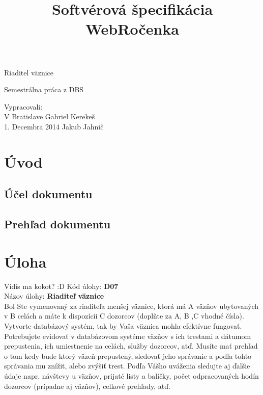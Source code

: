 \documentclass[slovak, 12pt, Times New Roman]{article}
\begin{document}
	\thispagestyle{fancy}
		\begin{center}\huge{Riaditel väznice\\\par}Semestrálna práca z DBS\end{center}
	\title{Softvérová špecifikácia WebRočenka}
	\date{}

	\begin{minipage}[b]{\textwidth}
	    \vspace{110mm}	 
	    \large   	\hspace{110mm} Vypracovali:\\
	    V Bratislave \hspace{82mm} Gabriel Kerekeš \\
	    1. Decembra 2014 \hspace{70mm} Jakub Jahnič \\
	    \vspace{-20mm} 
	\end{minipage}

	\clearpage
	\tableofcontents
	\clearpage

	\section{Úvod}
		\subsection{Účel dokumentu}

		\subsection{Prehľad dokumentu}
	\section{Úloha}
		Vidis ma kokot? :D
		Kód úlohy: \textbf{D07} \\
		Názov úlohy: \textbf{Riaditeľ väznice} \\

		Bol Ste vymenovaný za riaditeľa menšej väznice, ktorá má A väzňov ubytovaných v B celách a máte k dispozícii C dozorcov (doplňte za A, B
		,C vhodné čísla). Vytvorte databázový systém, tak by Vaša väznica mohla efektívne fungovať. Potrebujete evidovať v databázovom systéme 
		väzňov s ich trestami a dátumom prepustenia, ich umiestnenie na celách, služby dozorcov, atď. Musíte mať prehľad o tom kedy bude ktorý 
		väzeň prepustený, sledovať jeho správanie a podľa tohto správania mu znížit, alebo zvýšiť trest. Podľa Vášho uváženia sledujte aj 
		ďalšie údaje napr. návštevy u väzňov, prijaté listy a balíčky, počet odpracovaných hodín dozorcov (prípadne aj väzňov), celkové 
		prehľady, atď.
\end{document}
